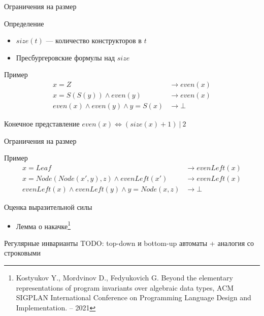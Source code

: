 \documentclass{beamer}
\begin{document}
\begin{frame}{Ограничения на размер}
\begin{block}{Определение}
\begin{itemize}
    \item $size(t)$ --- количество конструкторов в $t$
    \item Пресбургеровские формулы над $size$
\end{itemize}
\end{block}
\pause
\begin{block}{Пример}
\vspace{-1em}
\begin{align*}
x = Z &\to even(x)\\
x = S(S(y)) \wedge even(y) &\to even(x)\\
even(x) \wedge even(y) \wedge y = S(x) &\to \bot
\end{align*}

\end{block}
\begin{block}{Конечное представление}
$even(x) \iff (size(x) + 1)\ |\ 2$
\end{block}

\end{frame}

\begin{frame}{Ограничения на размер}
\begin{alertblock}{Пример}
\vspace{-1em}
\begin{align*}
    x = Leaf &\to evenLeft(x)\\
x = Node(Node(x',y), z) \wedge evenLeft(x')  &\to evenLeft(x)\\
evenLeft(x) \wedge evenLeft(y) \wedge y =  Node(x, z) &\to \bot
\end{align*}

\end{alertblock}
Оценка выразительной силы
\begin{itemize}
    \item Лемма о накачке\footnote{Kostyukov Y., Mordvinov D., Fedyukovich G. Beyond the elementary representations of program invariants over algebraic data types, ACM SIGPLAN International Conference on Programming Language Design and Implementation. – 2021}
\end{itemize}
    
\end{frame}

\begin{frame}{Регулярные инварианты}
TODO: top-down и bottom-up автоматы + аналогия со строковыми
\end{frame}
\end{document}
